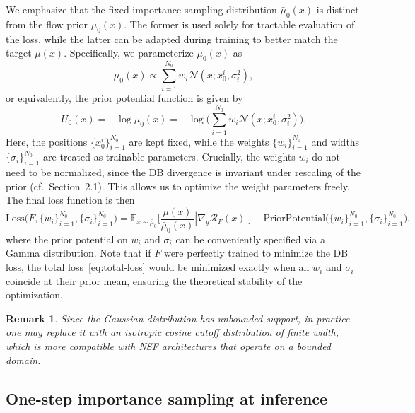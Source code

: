 \documentclass{article}
\newtheorem*{remark}{Remark}
\theoremstyle{plain}
\begin{document}
We emphasize that the fixed importance sampling distribution $\bar \mu_0(x)$ is distinct from the flow prior $\mu_0(x)$. The former is used solely for tractable evaluation of the loss, while the latter can be adapted during training to better match the target $\mu(x)$. Specifically, we parameterize $\mu_0(x)$ as
\begin{equation}\label{eq:prior-gmm}
    \mu_0(x) \propto \sum_{i=1}^{N_0} w_i \mathcal N(x; x_0^i,\sigma_i^2),
\end{equation}
or equivalently, the prior potential function is given by
\begin{equation}\label{eq:prior-potential}
    U_0(x) = -\log \mu_0(x) = -\log \bigg(\sum_{i=1}^{N_0} w_i \mathcal N(x; x_0^i,\sigma_i^2) \bigg).
\end{equation}
Here, the positions $\{x_0^i\}_{i=1}^{N_0}$ are kept fixed, while the weights $\{w_i\}_{i=1}^{N_0}$ and widths $\{\sigma_i\}_{i=1}^{N_0}$ are treated as trainable parameters. Crucially, the weights $w_i$ do not need to be normalized, since the DB divergence is invariant under rescaling of the prior (cf.\ Section~2.1). This allows us to optimize the weight parameters freely. The final loss function is then
\begin{equation}\label{eq:total-loss}
    \mathrm{Loss}\bigl(F, \{w_i\}_{i=1}^{N_0}, \{\sigma_i\}_{i=1}^{N_0} \bigr) = \mathbb E_{x\sim \bar \mu_0}\bigg[
    \frac{\mu(x)}{\bar \mu_0(x)} |\nabla_y \mathcal R_F(x)|
    \bigg] + \mathrm{PriorPotential}\big(\{w_i\}_{i=1}^{N_0}, \{\sigma_i\}_{i=1}^{N_0}\big),
\end{equation}
where the prior potential on $w_i$ and $\sigma_i$ can be conveniently specified via a Gamma distribution. Note that if $F$ were perfectly trained to minimize the DB loss, the total loss~\eqref{eq:total-loss} would be minimized exactly when all $w_i$ and $\sigma_i$ coincide at their prior mean, ensuring the theoretical stability of the optimization.

\begin{remark}
    Since the Gaussian distribution has unbounded support, in practice one may replace it with an isotropic cosine cutoff distribution of finite width, which is more compatible with NSF architectures that operate on a bounded domain.
\end{remark}

\subsection{One-step importance sampling at inference}
\end{document}
